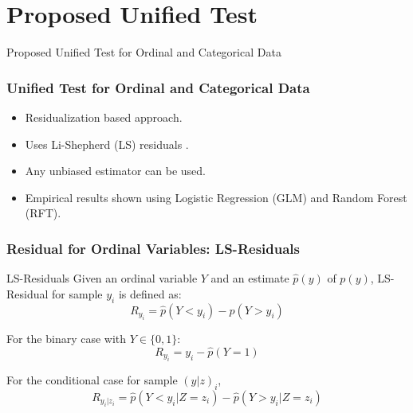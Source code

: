 \documentclass{beamer}
\begin{document}
\section{Proposed Unified Test}
\begin{frame}
	\begin{center} \Huge{Proposed Unified Test for Ordinal and Categorical Data} \end{center}
\end{frame}
\begin{frame}
	\frametitle{Unified Test for Ordinal and Categorical Data}
	\begin{itemize}
		\setlength\itemsep{1em}
		\item Residualization based approach.
		\item Uses Li-Shepherd (LS) residuals \footnotemark.
		\item Any unbiased estimator can be used.
		\item Empirical results shown using Logistic Regression (GLM) and Random Forest (RFT).
	\end{itemize}
\end{frame}


\begin{frame}
	\frametitle{Residual for Ordinal Variables: LS-Residuals}
	\begin{block}{LS-Residuals}
	Given an ordinal variable $ Y $ and an estimate $ \hat{p}(y) $ of $
	p(y) $, LS-Residual for sample $ y_i $ is defined as:
	$$ R_{y_i} = \hat{p}(Y < y_i) - \hat{p}(Y > y_i) $$
	\end{block}

	For the binary case with $ Y \in \{0, 1\} $:
	$$ R_{y_i} = y_i - \hat{p}(Y = 1) $$

	For the conditional case for sample $ (y|z)_i $,
	$$ R_{y_i | z_i} = \hat{p}(Y < y_i | Z=z_i) - \hat{p}(Y>y_i|Z=z_i) $$

\end{frame}
\end{document}
